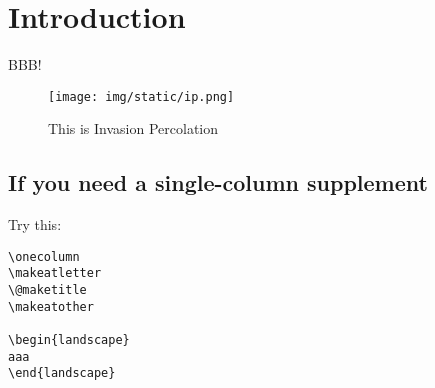 \section{Introduction}

BBB!  \cite{Asai2016}

\begin{figure}[tb]
 \texttt{[image: img/static/ip.png]}
 \caption{This is Invasion Percolation}
 \label{fig:ip-supplement}
\end{figure}

\subsection{If you need a single-column supplement}

Try this:

\begin{verbatim}
\onecolumn
\makeatletter
\@maketitle
\makeatother

\begin{landscape}
aaa
\end{landscape}
\end{verbatim}

